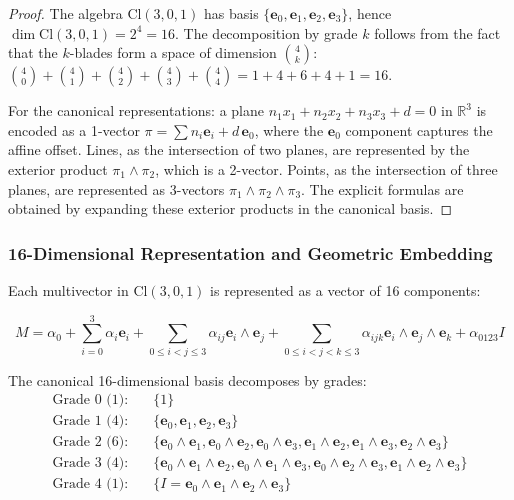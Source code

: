 \begin{proof}
The algebra $\text{Cl}(3,0,1)$ has basis $\{\mathbf{e}_0, \mathbf{e}_1, \mathbf{e}_2, \mathbf{e}_3\}$, hence $\dim \text{Cl}(3,0,1) = 2^4 = 16$. The decomposition by grade $k$ follows from the fact that the $k$-blades form a space of dimension $\binom{4}{k}$: $\binom{4}{0} + \binom{4}{1} + \binom{4}{2} + \binom{4}{3} + \binom{4}{4} = 1 + 4 + 6 + 4 + 1 = 16$.

For the canonical representations: a plane $n_1 x_1 + n_2 x_2 + n_3 x_3 + d = 0$ in $\mathbb{R}^3$ is encoded as a 1-vector $\pi = \sum n_i \mathbf{e}_i + d\,\mathbf{e}_0$, where the $\mathbf{e}_0$ component captures the affine offset. Lines, as the intersection of two planes, are represented by the exterior product $\pi_1 \wedge \pi_2$, which is a 2-vector. Points, as the intersection of three planes, are represented as 3-vectors $\pi_1 \wedge \pi_2 \wedge \pi_3$. The explicit formulas are obtained by expanding these exterior products in the canonical basis.
\end{proof}

\subsubsection{16-Dimensional Representation and Geometric Embedding}

\begin{definition}\label{def:espacio_representacion_gatr}
Each multivector in $\text{Cl}(3,0,1)$ is represented as a vector of 16 components:

\begin{equation}
    M = \alpha_0 + \sum_{i=0}^{3} \alpha_i \mathbf{e}_i + \sum_{0 \leq i < j \leq 3} \alpha_{ij} \mathbf{e}_i \wedge \mathbf{e}_j + \sum_{0 \leq i < j < k \leq 3} \alpha_{ijk} \mathbf{e}_i \wedge \mathbf{e}_j \wedge \mathbf{e}_k + \alpha_{0123} I
    \label{eq:gatr_multivector}
\end{equation}

The canonical 16-dimensional basis decomposes by grades:
\begin{align}
\text{Grade 0 (1):} \quad & \{1\} \\
\text{Grade 1 (4):} \quad & \{\mathbf{e}_0, \mathbf{e}_1, \mathbf{e}_2, \mathbf{e}_3\} \\
\text{Grade 2 (6):} \quad & \{\mathbf{e}_0 \wedge \mathbf{e}_1, \mathbf{e}_0 \wedge \mathbf{e}_2, \mathbf{e}_0 \wedge \mathbf{e}_3, \mathbf{e}_1 \wedge \mathbf{e}_2, \mathbf{e}_1 \wedge \mathbf{e}_3, \mathbf{e}_2 \wedge \mathbf{e}_3\} \\
\text{Grade 3 (4):} \quad & \{\mathbf{e}_0 \wedge \mathbf{e}_1 \wedge \mathbf{e}_2, \mathbf{e}_0 \wedge \mathbf{e}_1 \wedge \mathbf{e}_3, \mathbf{e}_0 \wedge \mathbf{e}_2 \wedge \mathbf{e}_3, \mathbf{e}_1 \wedge \mathbf{e}_2 \wedge \mathbf{e}_3\} \\
\text{Grade 4 (1):} \quad & \{I = \mathbf{e}_0 \wedge \mathbf{e}_1 \wedge \mathbf{e}_2 \wedge \mathbf{e}_3\}
\end{align}
\end{definition}

